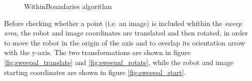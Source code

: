 \begin{figure}[htp]
\begin{center}
    \hspace*{15pt}

    \vspace*{20pt}

  \end{center}
  \caption{WithinBoundaries algorithm}
  \label{fig:withingboundaries}
\end{figure}

%
Before checking whether a point (i.e. an image) is included 
whithin the \textit{sweep area}, the robot and image coordinates
are translated and then rotated, in order to move the robot in 
the origin of the axis and to overlap its orientation arrow with 
the y-axis. The two transformations are shown in figure 
\ref{fig:sweepal_translate} and \ref{fig:sweepal_rotate}, 
while the robot and image starting coordinates are shown in 
figure \ref{fig:sweepal_start}.
%

